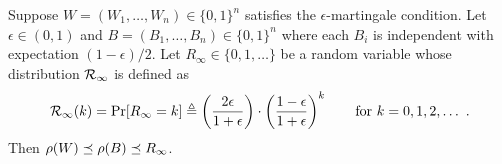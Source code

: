 \begin{lemma}\label{lemma:rho-stationary}
  Suppose $W = (W_1, \ldots, W_n) \in \{0,1\}^n$ satisfies the 
  $\epsilon$-martingale condition. 
  Let $\epsilon \in (0, 1)$ and $B = (B_1, \ldots, B_n) \in \{0,1\}^n$ 
  where each $B_i$ is independent with expectation $(1- \epsilon)/2$.
  Let $R_\infty \in \{0, 1, \ldots\}$ be a random variable 
  whose distribution $\mathcal{R}_\infty$ is defined as 
    \begin{equation}
      \label{eq:stationary}
      \StationaryRho(k) 
        = \Pr[R_\infty = k] 
        \defeq \left(\frac{2\epsilon}{1+\epsilon}\right)\cdot \left(\frac{1-\epsilon}{1 + \epsilon}\right)^k
        \qquad \text{for $k = 0, 1, 2, \ldots$}\ 
      \,.
    \end{equation}
  Then $\rho(W) \preceq \rho(B) \preceq R_\infty$.
\end{lemma}

